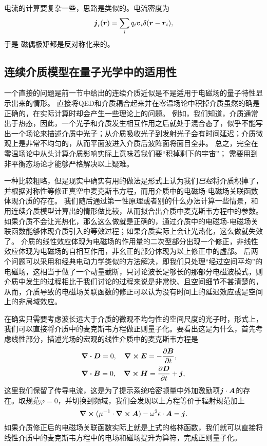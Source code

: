 电流的计算要复杂一些，思路是类似的。电流密度为
\[
    \vb*{j}_\text{r}(\vb*{r}) = \sum_i q_i \vb*{v}_i \delta(\vb*{r} - \vb*{r}_i),
\]
于是
磁偶极矩都是反对称化来的。

\subsection{连续介质模型在量子光学中的适用性}\label{sec:quantum-continuum}

一个直接的问题是前一节中给出的连续介质近似是不是适用于电磁场的量子特性显示出来的情形。
直接将QED和介质耦合起来并在零温场论中积掉介质虽然的确是正确的，在实际计算时却会产生一些理论上的问题。
例如，我们知道，介质通常出于热态，因此，一个光子和介质发生相互作用之后就处于混合态了，似乎不能写出一个场论来描述介质中光子；从介质吸收光子到发射光子会有时间延迟；介质微观上是非常不均匀的，从而平面波进入介质后波阵面将面目全非。
总之，完全在零温场论中从头计算介质影响实际上意味着我们要“积掉剩下的宇宙”；
需要用到非平衡态场论才能够严格解决以上疑难。

一种比较粗略，但是现实中确实有用的做法是形式上认为我们\emph{已经}将介质积掉了，并根据对称性等修正真空中麦克斯韦方程，而用介质中的电磁场-电磁场关联函数体现介质的存在。
我们随后通过第一性原理或者别的什么办法计算一些情景，和用连续介质模型计算出的情形做比较，从而拟合出介质中麦克斯韦方程中的参数。
如果介质不会让光热化，那么这么做就是正确的，通过介质中的电磁场-电磁场关联函数能够体现介质引入的等效过程；如果介质实际上会让光热化，这么做就失效了。
介质的线性效应体现为电磁场的作用量的二次型部分出现一个修正，非线性效应体现为电磁场的自相互作用，非幺正的部分体现为以上修正中的虚部。
后两个问题可以采用和经典电动力学类似的方法解决，即我们只处理“经过空间平均”的电磁场，这相当于做了一个动量截断，只讨论波长足够长的那部分电磁波模式，则介质中发生的过程相比于我们讨论的过程来说是非常快、且空间细节不甚清楚的，从而，介质导致的电磁场关联函数的修正可以认为没有时间上的延迟效应或是空间上的非局域效应。

在确实只需要考虑波长远大于介质的微观不均匀性的空间尺度的光子时，形式上，我们可以直接将介质中的麦克斯韦方程做正则量子化。要看出这是为什么，首先考虑线性部分，描述光场的宏观的线性介质中的麦克斯韦方程是
\[
    \begin{aligned}
        &\div{\vb*{D}} = 0, \quad \curl{\vb*{E}} = - \pdv{\vb*{B}}{t}, \\
        &\div{\vb*{B}} = 0, \quad \curl{\vb*{H}} = \pdv{\vb*{D}}{t} + \vb*{j},
    \end{aligned}
\]
这里我们保留了传导电流，这是为了提示系统哈密顿量中外加激励项$\vb*{j} \cdot \vb*{A}$的存在。取规范$\varphi=0$，并切换到频域，我们会发现以上方程等价于辐射规范加上
\begin{equation}
    \curl{(\mu^{-1} \cdot \curl{\vb*{A}})} - \omega^2 \epsilon \cdot \vb*{A} = \vb*{j}.
    \label{eq:photon-in-material}
\end{equation}
如果介质修正后的电磁场关联函数实际上就是上式的格林函数，我们就可以直接将线性介质中的麦克斯韦方程中的电场和磁场提升为算符，完成正则量子化。

